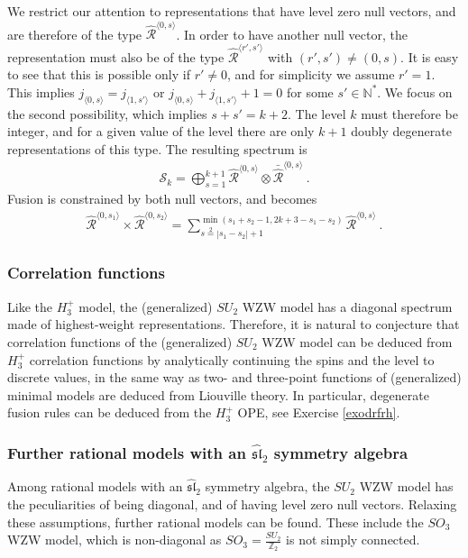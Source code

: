 \documentclass[12pt, a4paper, notitlepage, twoside]{report}
\numberwithin{equation}{section}
\theoremstyle{break}
\begin{document}
We restrict our attention to representations that have level zero null vectors, and are therefore of the type $\hat{\mathcal{R}}^{\langle 0, s\rangle}$. In order to have another null vector, the representation must also be of the type $\hat{\mathcal{R}}^{\langle r', s'\rangle}$ with $(r',s')\neq (0,s)$. It is easy to see that this is possible only if $r'\neq 0$, and for simplicity we assume $r'=1$. This implies $j_{\langle 0, s\rangle} = j_{\langle 1, s'\rangle} $ or $j_{\langle 0, s\rangle} + j_{\langle 1, s'\rangle} +1=0$ for some $s'\in\mathbb{N}^*$. We focus on the second possibility, which implies $s+s'=k+2$. The level $k$ must therefore be integer, and for a given value of the level there are only $k+1$ doubly degenerate representations of this type. The resulting spectrum is
\begin{align}
 \mathcal{S}_k = \bigoplus_{s=1}^{k+1} \hat{\mathcal{R}}^{\langle 0, s\rangle}\otimes \bar{\hat{\mathcal{R}}}^{\langle 0, s\rangle}\ .
\end{align}
Fusion is constrained by both null vectors, and becomes 
\begin{align}
 \hat{\mathcal{R}}^{\langle 0, s_1\rangle}\times\hat{\mathcal{R}}^{\langle 0, s_2\rangle} = \sum_{s\overset{2}{=}|s_1-s_2|+1}^{\min(s_1+s_2-1,2k+3-s_1-s_2)} \hat{\mathcal{R}}^{\langle 0, s\rangle}\ .
\end{align}

\subsubsection{Correlation functions}

Like the $H_3^+$ model, the (generalized) $SU_2$ WZW model has a diagonal spectrum made of highest-weight representations.
Therefore, it is natural to conjecture that correlation functions of the (generalized) $SU_2$ WZW model can be deduced from $H_3^+$ correlation functions by analytically continuing the spins and the level to discrete values, in the same way as two- and three-point functions of (generalized) minimal models  are deduced from Liouville theory. 
In particular, degenerate fusion rules can be deduced from the $H_3^+$ OPE, see Exercise \ref{exodrfrh}.

\subsubsection{Further rational models with an $\widehat{\mathfrak{sl}}_2$ symmetry algebra}

Among rational models with an $\widehat{\mathfrak{sl}}_2$ symmetry algebra,
the $SU_2$ WZW model has the peculiarities of being diagonal, and of having level zero null vectors. 
Relaxing these assumptions, further rational models can be found.
These include the $SO_3$ WZW model, which is non-diagonal as $SO_3 = \frac{SU_2}{\mathbb{Z}_2}$ is not simply connected.
\end{document}
